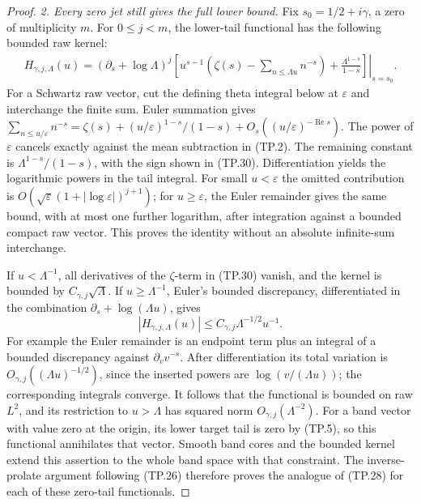 \begin{proof}
\emph{2. Every zero jet still gives the full lower bound.}
Fix \(s_0=1/2+i\gamma\), a zero of multiplicity \(m\).
For \(0\leq j<m\), the lower-tail functional has the
following bounded raw kernel:
\[
 \begin{split}
 H_{\gamma,j,\Lambda}(u)
  =\left.(\partial_s+\log\Lambda)^j
   \left[
    u^{s-1}\left(\zeta(s)-\sum_{n\leq\Lambda u}n^{-s}\right)
          +\frac{\Lambda^{1-s}}{1-s}
   \right]\right|_{s=s_0}.
 \end{split}
 \tag{TP.30}
\]
For a Schwartz raw vector, cut the defining theta
integral below at \(\varepsilon\) and interchange
the finite sum.  Euler summation gives
\(\sum_{n\leq u/\varepsilon}n^{-s}
 =\zeta(s)+(u/\varepsilon)^{1-s}/(1-s)
       +O_s((u/\varepsilon)^{-\operatorname{Re}s})\).
The power of \(\varepsilon\) cancels exactly against
the mean subtraction in (TP.2).  The remaining
constant is \(\Lambda^{1-s}/(1-s)\), with the sign
shown in (TP.30).  Differentiation yields the
logarithmic powers in the tail integral.
For small \(u<\varepsilon\) the omitted contribution
is \(O(\sqrt{\varepsilon}(1+|\log\varepsilon|)^{j+1})\);
for \(u\geq\varepsilon\), the Euler remainder gives
the same bound, with at most one further logarithm,
after integration against a bounded compact raw
vector.  This proves the identity without an
absolute infinite-sum interchange.

If \(u<\Lambda^{-1}\), all derivatives of the
\(\zeta\)-term in (TP.30) vanish, and the kernel is
bounded by \(C_{\gamma,j}\sqrt{\Lambda}\).
If \(u\geq\Lambda^{-1}\), Euler's bounded discrepancy,
differentiated in the combination
\(\partial_s+\log(\Lambda u)\), gives
\[
       |H_{\gamma,j,\Lambda}(u)|
                       \leq C_{\gamma,j}\Lambda^{-1/2}u^{-1}.
 \tag{TP.31}
\]
For example the Euler remainder is an endpoint
term plus an integral of a bounded discrepancy
against \(\partial_v v^{-s}\).
After differentiation its total variation is
\(O_{\gamma,j}((\Lambda u)^{-1/2})\), since the
inserted powers are \(\log(v/(\Lambda u))\);
the corresponding integrals converge.
It follows that the functional is bounded on raw
\(L^2\), and its restriction to \(u>\Lambda\)
has squared norm \(O_{\gamma,j}(\Lambda^{-2})\).
For a band vector with value zero at the origin,
its lower target tail is zero by (TP.5), so this
functional annihilates that vector.  Smooth band
cores and the bounded kernel extend this assertion
to the whole band space with that constraint.
The inverse-prolate argument following (TP.26)
therefore proves the analogue of (TP.28) for each
of these zero-tail functionals.


\end{proof}
